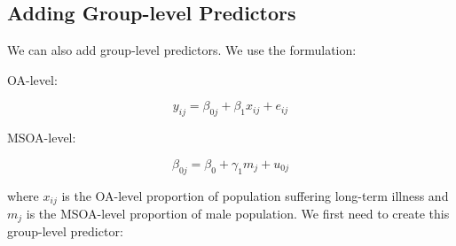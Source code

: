 \documentclass[]{book}
\newenvironment{Shaded}{\begin{snugshade}}{\end{snugshade}}
\newcommand{\KeywordTok}[1]{\textcolor[rgb]{0.13,0.29,0.53}{\textbf{#1}}}
\newcommand{\DataTypeTok}[1]{\textcolor[rgb]{0.13,0.29,0.53}{#1}}
\newcommand{\DecValTok}[1]{\textcolor[rgb]{0.00,0.00,0.81}{#1}}
\newcommand{\StringTok}[1]{\textcolor[rgb]{0.31,0.60,0.02}{#1}}
\newcommand{\CommentTok}[1]{\textcolor[rgb]{0.56,0.35,0.01}{\textit{#1}}}
\newcommand{\OtherTok}[1]{\textcolor[rgb]{0.56,0.35,0.01}{#1}}
\newcommand{\OperatorTok}[1]{\textcolor[rgb]{0.81,0.36,0.00}{\textbf{#1}}}
\newcommand{\NormalTok}[1]{#1}
\begin{document}
\hypertarget{adding-group-level-predictors}{\subsection{Adding
Group-level Predictors}\label{adding-group-level-predictors}}

We can also add group-level predictors. We use the formulation:

OA-level:

\[y_{ij} = \beta_{0j} + \beta_{1}x_{ij} + e_{ij}\]

MSOA-level:

\[\beta_{0j} = \beta_{0} + \gamma_{1}m_{j} + u_{0j}\]

where \(x_{ij}\) is the OA-level proportion of population suffering
long-term illness and \(m_{j}\) is the MSOA-level proportion of male
population. We first need to create this group-level predictor:

\begin{Shaded}
\end{Shaded}
\end{document}
